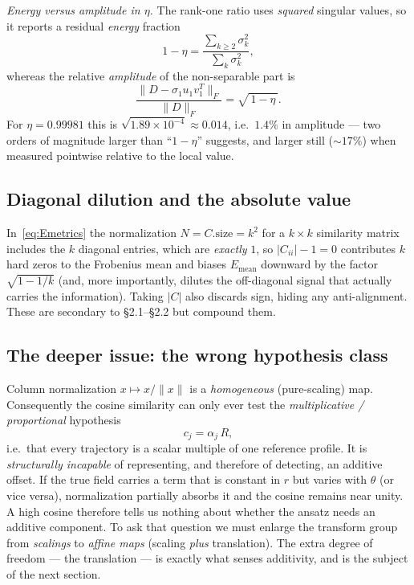 \documentclass{article}
\begin{document}
\emph{Energy versus amplitude in $\eta$.} The rank-one ratio uses
\emph{squared} singular values, so it reports a residual \emph{energy}
fraction
\begin{equation}
1-\eta=\frac{\sum_{k\ge2}\sigma_{k}^{2}}{\sum_{k}\sigma_{k}^{2}},
\end{equation}
whereas the relative \emph{amplitude} of the non-separable part is
\begin{equation}
\frac{\bigl\|D-\sigma_{1}u_{1}v_{1}^{T}\bigr\|_{F}}{\|D\|_{F}}
=\sqrt{\,1-\eta\,}.
\end{equation}
For $\eta=0.99981$ this is $\sqrt{1.89\times10^{-4}}\approx0.014$, i.e.\ $1.4\%$
in amplitude --- two orders of magnitude larger than ``$1-\eta$'' suggests, and
larger still ($\sim17\%$) when measured pointwise relative to the local value.

\subsection{Diagonal dilution and the absolute value}

In~\eqref{eq:Emetrics} the normalization $N=C.\mathrm{size}=k^{2}$ for a
$k\times k$ similarity matrix includes the $k$ diagonal entries, which are
\emph{exactly} $1$, so $|C_{ii}|-1=0$ contributes $k$ hard zeros to the
Frobenius mean and biases $E_{\mathrm{mean}}$ downward by the factor
$\sqrt{1-1/k}$ (and, more importantly, dilutes the off-diagonal signal that
actually carries the information). Taking $|C|$ also discards sign, hiding
any anti-alignment. These are secondary to \S2.1--\S2.2 but compound them.

\subsection{The deeper issue: the wrong hypothesis class}

Column normalization $x\mapsto x/\|x\|$ is a \emph{homogeneous} (pure-scaling)
map. Consequently the cosine similarity can only ever test the
\emph{multiplicative / proportional} hypothesis
\begin{equation}
c_{j}=\alpha_{j}\,R ,
\end{equation}
i.e.\ that every trajectory is a scalar multiple of one reference profile. It
is \emph{structurally incapable} of representing, and therefore of detecting,
an additive offset. If the true field carries a term that is constant in $r$
but varies with $\theta$ (or vice versa), normalization partially absorbs it
and the cosine remains near unity. A high cosine therefore tells us nothing
about whether the ansatz needs an additive component. To ask that question we
must enlarge the transform group from \emph{scalings} to \emph{affine maps}
(scaling \emph{plus} translation). The extra degree of freedom --- the
translation --- is exactly what senses additivity, and is the subject of the
next section.
\end{document}
